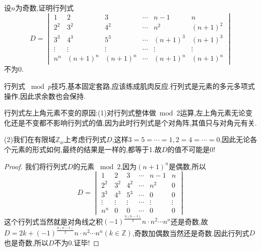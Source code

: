 \documentclass[../../main.tex]{subfiles}%
\begin{document}
\begin{example}
设\( n \)为奇数,证明行列式
\[
D = \begin{vmatrix}
1 & 2 & 3 & \cdots & n-1 & n \\
2^2 & 3^2 & 4^2 & \cdots & n^2 & (n+1)^2 \\
3^3 & 4^3 & 5^3 & \cdots & (n+1)^3 & (n+1)^3 \\
\vdots & \vdots & \vdots & \cdots & \vdots & \vdots \\
n^n & (n+1)^n & (n+1)^n & \cdots & (n+1)^n & (n+1)^n
\end{vmatrix}
\]
不为0.
\end{example}
\begin{note}
行列式 \(\bmod p\)技巧,基本固定套路,应该练成肌肉反应.行列式是元素的多元多项式操作,因此求余数也会保持.
\end{note}
\begin{remark}
行列式左上角元素不变的原因:(1)对行列式整体做$\bmod 2$运算,左上角元素无论变化还是不变都不影响行列式的值,因为此时行列式是个对角阵,其值只与对角元有关.

(2)我们在有限域\( \mathbb{Z}_w \)上考虑行列式\( D \),这样$3=5=\cdots =1,2=4=\cdots =0$,因此无论各个元素的形式如何,最终的结果是一样的,都等于1.故$D$的值不可能是0!
\end{remark}
\begin{proof}

我们将行列式\( D \)的元素 \(\bmod 2\),因为\( (n+1)^n \)是偶数,所以
\[
D = \begin{vmatrix}
1 & 2 & 3 & \cdots & n-1 & n \\
2^2 & 3^2 & 4^2 & \cdots & n^2 & 0 \\
3^3 & 4^3 & 5^3 & \cdots & 0 & 0 \\
\vdots & \vdots & \vdots & \cdots & \vdots & \vdots \\
n^n & 0 & 0 & \cdots & 0 & 0
\end{vmatrix}
\]
这个行列式当然就是对角线之积\(\left( -1 \right) ^{\frac{n\left( n-1 \right)}{2}}n\cdot n^2\cdots n^n\)还是奇数,故$D=2k+\left( -1 \right) ^{\frac{n\left( n-1 \right)}{2}}n\cdot n^2\cdots n^n(k\in \mathbb{Z})$,奇数加偶数当然还是奇数.因此行列式\( D \)也是奇数,所以\( D \)不为0.证毕!

\end{proof}
\end{document}

